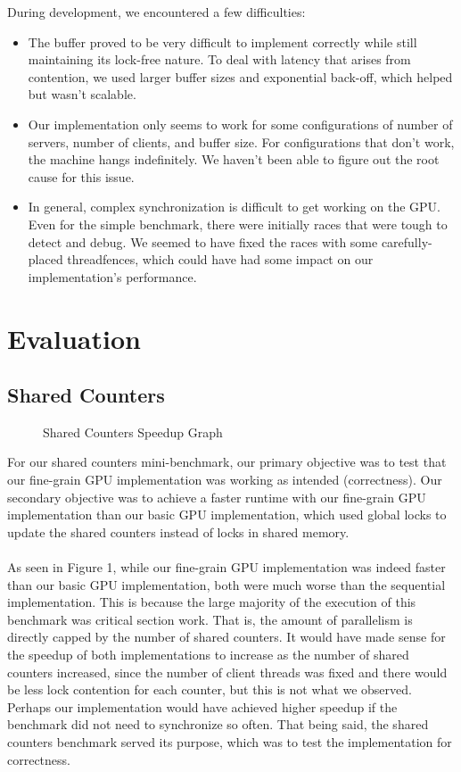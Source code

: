 \documentclass{article}
\begin{document}
During development, we encountered a few difficulties:
\begin{itemize}
    \item The buffer proved to be very difficult to implement correctly while still maintaining its lock-free nature. To deal with latency that arises from contention, we used larger buffer sizes and exponential back-off, which helped but wasn't scalable.
    \item Our implementation only seems to work for some configurations of number of servers, number of clients, and buffer size. For configurations that don't work, the machine hangs indefinitely. We haven't been able to figure out the root cause for this issue.
    \item In general, complex synchronization is difficult to get working on the GPU. Even for the simple benchmark, there were initially races that were tough to detect and debug. We seemed to have fixed the races with some carefully-placed threadfences, which could have had some impact on our implementation's performance.
\end{itemize}

\section{Evaluation}

\subsection{Shared Counters}
\begin{figure}[H]
    \centering
    
    \caption{Shared Counters Speedup Graph}
    \label{fig:enter-label}
\end{figure}

For our shared counters mini-benchmark, our primary objective was to test that our fine-grain GPU implementation was working as intended (correctness). Our secondary objective was to achieve a faster runtime with our fine-grain GPU implementation than our basic GPU implementation, which used global locks to update the shared counters instead of locks in shared memory.
\\
\\
As seen in Figure 1, while our fine-grain GPU implementation was indeed faster than our basic GPU implementation, both were much worse than the sequential implementation. This is because the large majority of the execution of this benchmark was critical section work. That is, the amount of parallelism is directly capped by the number of shared counters. It would have made sense for the speedup of both implementations to increase as the number of shared counters increased, since the number of client threads was fixed and there would be less lock contention for each counter, but this is not what we observed. Perhaps our implementation would have achieved higher speedup if the benchmark did not need to synchronize so often. That being said, the shared counters benchmark served its purpose, which was to test the implementation for correctness.
\end{document}
